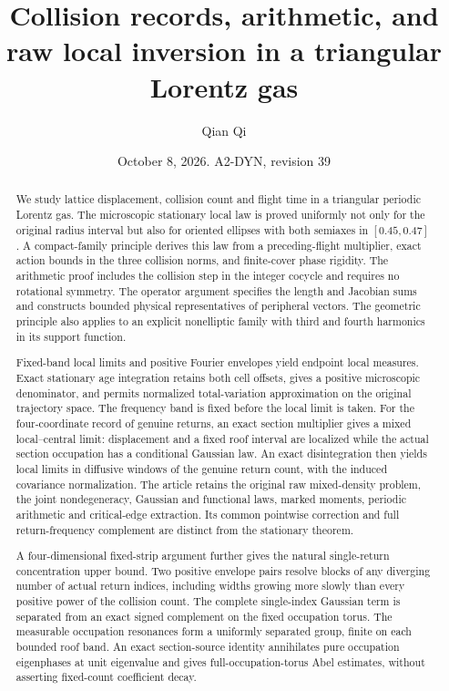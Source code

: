 \documentclass[11pt,reqno]{amsart}
\title[Collision records and raw local inversion]{Collision records, arithmetic, and raw local inversion in a triangular Lorentz gas}
\author{Qian Qi}
\date{October 8, 2026. A2-DYN, revision 39}
\numberwithin{equation}{section}
\theoremstyle{definition}\newtheorem{definition}[theorem]{Definition}
\theoremstyle{remark}\newtheorem{remark}[theorem]{Remark}
\begin{document}
\raggedbottom
\begin{abstract}
We study lattice displacement, collision count and flight time in a
triangular periodic Lorentz gas. The microscopic stationary local law
is proved uniformly not only for the original radius interval but also
for oriented ellipses with both semiaxes in $[0.45,0.47]$. A compact-family
principle derives this law from a preceding-flight multiplier, exact
action bounds in the three collision norms, and finite-cover phase
rigidity. The arithmetic proof includes the collision step in the
integer cocycle and requires no rotational symmetry. The operator
argument specifies the length and Jacobian sums and constructs bounded
physical representatives of peripheral vectors. The geometric principle
also applies to an explicit nonelliptic family with third and fourth
harmonics in its support function.

Fixed-band local limits and positive Fourier envelopes yield endpoint
local measures. Exact stationary age integration retains both cell
offsets, gives a positive microscopic denominator, and permits
normalized total-variation approximation on the original trajectory
space. The frequency band is fixed before the local limit is taken.
For the four-coordinate record of genuine returns, an exact section
multiplier gives a mixed local--central limit: displacement and a
fixed roof interval are localized while the actual section occupation
has a conditional Gaussian law. An exact disintegration then yields
local limits in diffusive windows of the genuine return count, with
the induced covariance normalization. The article retains the original
raw mixed-density problem, the joint nondegeneracy,
Gaussian and functional laws, marked moments, periodic arithmetic and
critical-edge extraction. Its common pointwise correction and full
return-frequency complement are distinct from the stationary theorem.

A four-dimensional fixed-strip argument further gives the natural
single-return concentration upper bound. Two positive envelope pairs
resolve blocks of any diverging number of actual return indices,
including widths growing more slowly than every positive power of the
collision count. The complete single-index Gaussian term is separated
from an exact signed complement on the fixed occupation torus.
The measurable occupation resonances form a uniformly separated group,
finite on each bounded roof band. An exact section-source identity
annihilates pure occupation eigenphases at unit eigenvalue and gives
full-occupation-torus Abel estimates, without asserting fixed-count
coefficient decay.
\end{abstract}
\maketitle
\enlargethispage{3pt}
\end{document}
